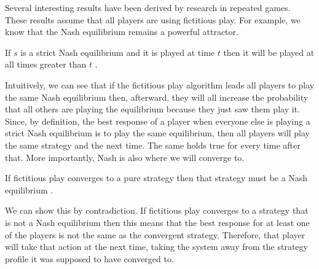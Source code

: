 Several interesting results have been derived by research in repeated
games. These results assume that all players are using fictitious
play. For example, we know that the Nash equilibrium remains a
powerful attractor.

\begin{theorem} If
  $s$ is a strict Nash equilibrium and it is played at time $t$ then
  it will be played at all times greater than $t$ \cite{fudenberg90a}.
\end{theorem}


Intuitively, we can see that if the fictitious play algorithm leads
all players to play the same Nash equilibrium then, afterward, they
will all increase the probability that all others are playing the
equilibrium because they just saw them play it. Since, by definition,
the best response of a player when everyone else is playing a strict
Nash equilibrium is to play the same equilibrium, then all players
will play the same strategy and the next time. The same holds true for
every time after that. More importantly, Nash is also where we will
converge to.

\begin{theorem} If fictitious play
  converges to a pure strategy then that strategy must be a Nash
  equilibrium \cite{fudenberg90a}.
\end{theorem}


We can show this by contradiction. If fictitious play converges to a
strategy that is not a Nash equilibrium then this means that the best
response for at least one of the players is not the same as the
convergent strategy. Therefore, that player will take that action at
the next time, taking the system away from the strategy profile it was
supposed to have converged to.

